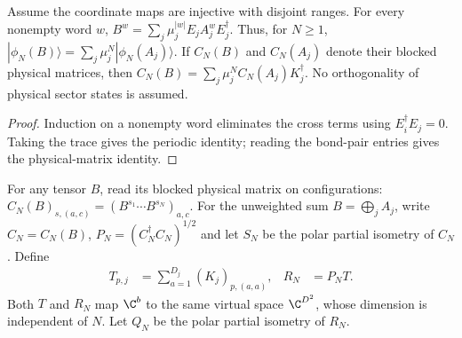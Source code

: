 \begin{lemma}
    \label{thm:ldp_embedded_sector_words}
    \leanok
    Assume the coordinate maps are injective with disjoint ranges.
    For every nonempty word $w$,
    $B^w=\sum_j\mu_j^{|w|}E_jA_j^wE_j^\dagger$.
    Thus, for $N\ge1$, $|\phi_N(B)\rangle=\sum_j\mu_j^N|\phi_N(A_j)\rangle$.
    If $C_N(B)$ and $C_N(A_j)$ denote their blocked physical matrices,
    then $C_N(B)=\sum_j\mu_j^NC_N(A_j)K_j^\dagger$.
    No orthogonality of physical sector states is assumed.
\end{lemma}
\begin{proof}\leanok
    Induction on a nonempty word eliminates the cross terms using
    $E_i^\dagger E_j=0$. Taking the trace gives the periodic identity;
    reading the bond-pair entries gives the physical-matrix identity.
\end{proof}

\begin{definition}
    \label{def:ldp_exact_sector_coefficients}
    \leanok
    For any tensor $B$, read its blocked physical matrix on configurations:
    $C_N(B)_{s,(a,c)}=(B^{s_1}\cdots B^{s_N})_{a,c}$.
    For the unweighted sum $B=\bigoplus_jA_j$, write $C_N=C_N(B)$,
    $P_N=(C_N^\dagger C_N)^{1/2}$ and let $S_N$ be the polar partial
    isometry of $C_N$. Define
    \begin{align}
        T_{p,j} & =\sum_{a=1}^{D_j}(K_j)_{p,(a,a)}, &
        R_N     & =P_NT.
        \label{eq:ldp_virtual_sector_coefficients}
    \end{align}
    Both $T$ and $R_N$ map $\C^b$ to the same virtual space $\C^{D^2}$,
    whose dimension is independent of $N$. Let $Q_N$ be the polar
    partial isometry of $R_N$.
\end{definition}

